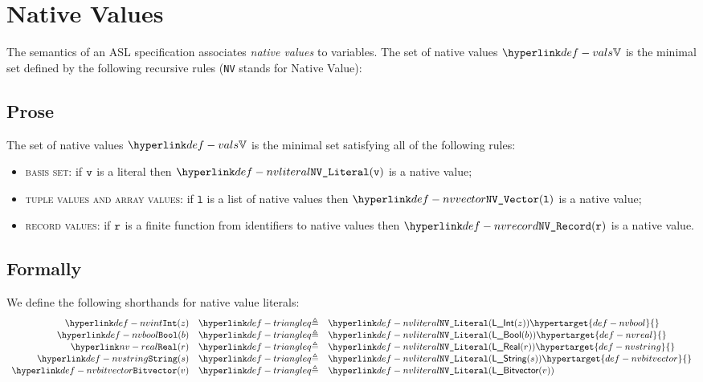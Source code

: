 \documentclass{book}
\newcommand\vl[0]{\texttt{l}}
\begin{document}
\section{Native Values \label{sec:nativevalues}}
\hypertarget{def-vals}{}
The semantics of an ASL specification associates \emph{native values} to variables.
The set of native values $\vals$ is the minimal set defined by the following recursive rules (\texttt{NV} stands for Native Value):

\subsection{Prose}
The set of native values $\vals$ is the minimal set satisfying all of the following rules:
\begin{itemize}
  \item \textsc{basis set}: if $\texttt{v}$ is a literal then $\nvliteral{\vv}$ is a native value;
  \item \textsc{tuple values and array values}: if $\vl$ is a list of native values then $\nvvector{\vl}$ is a native value;
  \item \textsc{record values}: if $\texttt{r}$ is a finite function from identifiers to native values then $\nvrecord{\vr}$ is a native value.
\end{itemize}

\subsection{Formally}
\hypertarget{def-nvliteral}{}
\hypertarget{def-nvvector}{}
\hypertarget{def-nvrecord}{}

We define the following shorthands for native value literals:
\hypertarget{def-nvint}{}
\[
\begin{array}{rcl}
\nvint(z)       &\triangleq& \nvliteral{\lint(z)}           \hypertarget{def-nvbool}{}\\
\nvbool(b)      &\triangleq& \nvliteral{\lbool(b)}          \hypertarget{def-nvreal}{}\\
\nvreal(r)      &\triangleq& \nvliteral{\lreal(r)}          \hypertarget{def-nvstring}{}\\
\nvstring(s)    &\triangleq& \nvliteral{\lstring(s)}        \hypertarget{def-nvbitvector}{}\\
\nvbitvector(v) &\triangleq& \nvliteral{\lbitvector(v)}\\
\end{array}
\]
\end{document}
